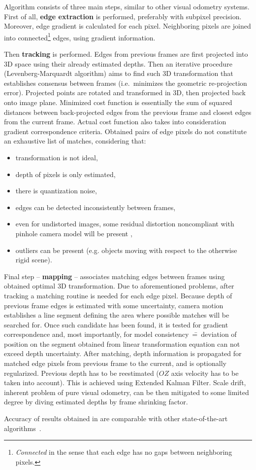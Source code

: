 Algorithm consists of three main steps, similar to other visual odometry systems. First of all, \textbf{edge extraction} is performed, preferably with subpixel precision. Moreover, edge gradient is calculated for each pixel. Neighboring pixels are joined into connected\footnote{\textit{Connected} in the sense that each edge has no gaps between neighboring pixels.} edges, using gradient information.

Then \textbf{tracking} is performed. Edges from previous frames are first projected into 3D space using their already estimated depths. Then an iterative procedure (Levenberg-Marquardt algorithm) aims to find such 3D transformation that establishes consensus between frames (i.e.~minimizes the geometric re-projection error). Projected points are rotated and transformed in 3D, then projected back onto image plane. Minimized cost function is essentially the sum of squared distances between back-projected edges from the previous frame and closest edges from the current frame. Actual cost function also takes into consideration gradient correspondence criteria. Obtained pairs of edge pixels do not constitute an exhaustive list of matches, considering that:
\begin{itemize}
\item transformation is not ideal,
\item depth of pixels is only estimated,
\item there is quantization noise,
\item edges can be detected inconsistently between frames,
\item even for undistorted images, some residual distortion noncompliant with pinhole camera model will be present \cite{barreto2007non},
\item outliers can be present (e.g. objects moving with respect to the otherwise rigid scene).
\end{itemize}
 
Final step -- \textbf{mapping} -- associates matching edges between frames using obtained optimal 3D transformation. Due to aforementioned problems, after tracking a matching routine is needed for each edge pixel. Because depth of previous frame edges is estimated with some uncertainty, camera motion establishes a line segment defining the area where possible matches will be searched for. Once such candidate has been found, it is tested for gradient correspondence and, most importantly, for model consistency~\==~deviation of position on the segment obtained from linear transformation equation can not exceed depth uncertainty. After matching, depth information is propagated for matched edge pixels from previous frame to the current, and is optionally regularized. Previous depth has to be reestimated ($OZ$ axis velocity has to be taken into account). This is achieved using Extended Kalman Filter. Scale drift, inherent problem of pure visual odometry, can be then mitigated to some limited degree by diving estimated depths by frame shrinking factor.

Accuracy of results obtained in \cite{jose2015realtime} are comparable with other state-of-the-art algorithms~\cite{yang2017direct}.


